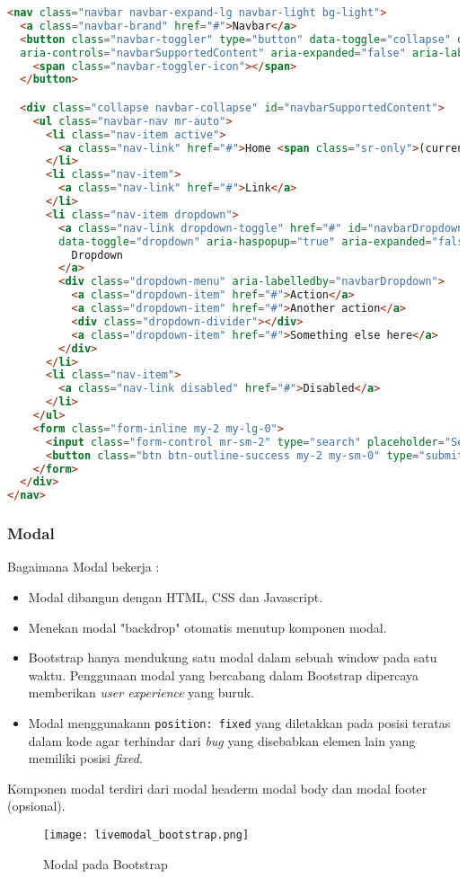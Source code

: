 \begin{itemize}
\begin{lstlisting}[language=HTML, frame=single, basicstyle=\small]  
<nav class="navbar navbar-expand-lg navbar-light bg-light">
  <a class="navbar-brand" href="#">Navbar</a>
  <button class="navbar-toggler" type="button" data-toggle="collapse" data-target="#navbarSupportedContent" 
  aria-controls="navbarSupportedContent" aria-expanded="false" aria-label="Toggle navigation">
    <span class="navbar-toggler-icon"></span>
  </button>

  <div class="collapse navbar-collapse" id="navbarSupportedContent">
    <ul class="navbar-nav mr-auto">
      <li class="nav-item active">
        <a class="nav-link" href="#">Home <span class="sr-only">(current)</span></a>
      </li>
      <li class="nav-item">
        <a class="nav-link" href="#">Link</a>
      </li>
      <li class="nav-item dropdown">
        <a class="nav-link dropdown-toggle" href="#" id="navbarDropdown" role="button" 
        data-toggle="dropdown" aria-haspopup="true" aria-expanded="false">
          Dropdown
        </a>
        <div class="dropdown-menu" aria-labelledby="navbarDropdown">
          <a class="dropdown-item" href="#">Action</a>
          <a class="dropdown-item" href="#">Another action</a>
          <div class="dropdown-divider"></div>
          <a class="dropdown-item" href="#">Something else here</a>
        </div>
      </li>
      <li class="nav-item">
        <a class="nav-link disabled" href="#">Disabled</a>
      </li>
    </ul>
    <form class="form-inline my-2 my-lg-0">
      <input class="form-control mr-sm-2" type="search" placeholder="Search" aria-label="Search">
      <button class="btn btn-outline-success my-2 my-sm-0" type="submit">Search</button>
    </form>
  </div>
</nav>
\end{lstlisting}

\subsubsection{Modal}
Bagaimana Modal bekerja :
\begin{itemize}
\item Modal dibangun dengan HTML, CSS dan Javascript. 
\item Menekan modal "backdrop" otomatis menutup komponen modal.
\item Bootstrap hanya mendukung satu modal dalam sebuah window pada satu waktu. Penggunaan modal yang bercabang dalam Bootstrap dipercaya memberikan \textit{user experience} yang buruk.
\item Modal menggunakann \texttt{position: fixed} yang diletakkan pada posisi teratas dalam kode agar terhindar dari \textit{bug} yang disebabkan elemen lain yang memiliki posisi \textit{fixed}. 
\end{itemize}
Komponen modal terdiri dari modal headerm modal body dan modal footer (opsional).
\begin{figure} [H]
	\centering  
	\texttt{[image: livemodal\_bootstrap.png]}  
	\caption{Modal pada Bootstrap} 
\end{figure}


\end{itemize}
